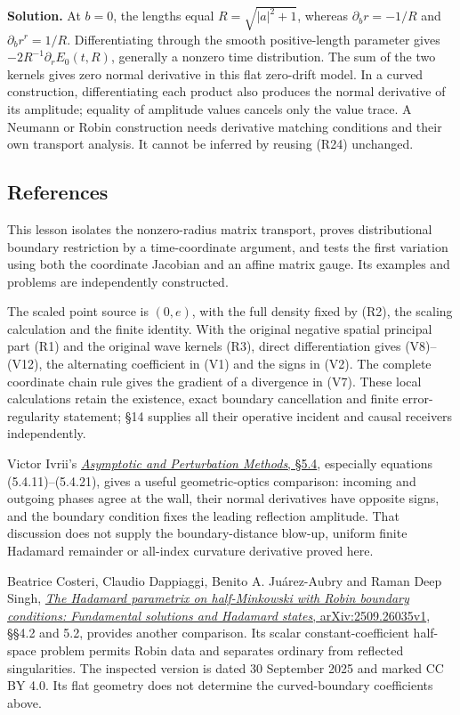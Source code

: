 \documentclass[
  11pt,
]{article}
\begin{document}
\textbf{Solution.} At \(b=0\), the lengths equal \(R=\sqrt{|a|^2+1}\),
whereas \(\partial_b r=-1/R\) and \(\partial_b r^r=1/R\).
Differentiating through the smooth positive-length parameter gives
\(-2R^{-1}\partial_rE_0(t,R)\), generally a nonzero time distribution.
The sum of the two kernels gives zero normal derivative in this flat
zero-drift model. In a curved construction, differentiating each product
also produces the normal derivative of its amplitude; equality of
amplitude values cancels only the value trace. A Neumann or Robin
construction needs derivative matching conditions and their own
transport analysis. It cannot be inferred by reusing (R24) unchanged.

\subsection{References}\label{references}

This lesson isolates the nonzero-radius matrix transport, proves
distributional boundary restriction by a time-coordinate argument, and
tests the first variation using both the coordinate Jacobian and an
affine matrix gauge. Its examples and problems are independently
constructed.

The scaled point source is \((0,e)\), with the full density fixed by
(R2), the scaling calculation and the finite identity. With the original
negative spatial principal part (R1) and the original wave kernels (R3),
direct differentiation gives (V8)--(V12), the alternating coefficient in
(V1) and the signs in (V2). The complete coordinate chain rule gives the
gradient of a divergence in (V7). These local calculations retain the
existence, exact boundary cancellation and finite error-regularity
statement; §14 supplies all their operative incident and causal
receivers independently.

Victor Ivrii's
\href{https://www.math.utoronto.ca/ivrii/APM-textbook/Chapter5/L5.4.html}{\emph{Asymptotic
and Perturbation Methods}, §5.4}, especially equations
(5.4.11)--(5.4.21), gives a useful geometric-optics comparison: incoming
and outgoing phases agree at the wall, their normal derivatives have
opposite signs, and the boundary condition fixes the leading reflection
amplitude. That discussion does not supply the boundary-distance
blow-up, uniform finite Hadamard remainder or all-index curvature
derivative proved here.

Beatrice Costeri, Claudio Dappiaggi, Benito A. Juárez-Aubry and Raman
Deep Singh, \href{https://arxiv.org/html/2509.26035v1}{\emph{The
Hadamard parametrix on half-Minkowski with Robin boundary conditions:
Fundamental solutions and Hadamard states}, arXiv:2509.26035v1}, §§4.2
and 5.2, provides another comparison. Its scalar constant-coefficient
half-space problem permits Robin data and separates ordinary from
reflected singularities. The inspected version is dated 30 September
2025 and marked CC BY 4.0. Its flat geometry does not determine the
curved-boundary coefficients above.
\end{document}
